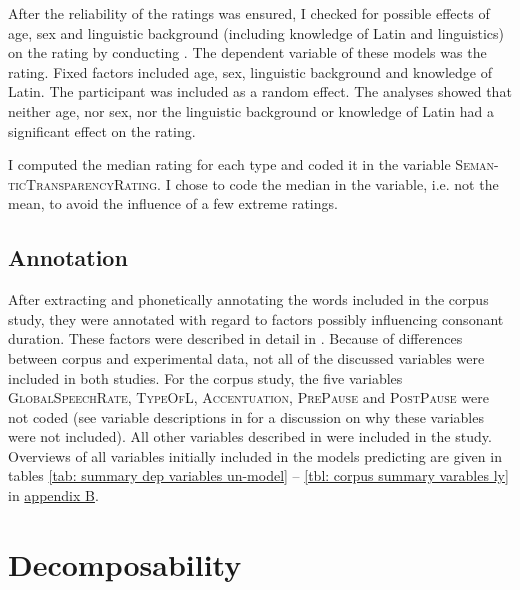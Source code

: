 After the reliability of the ratings was ensured, I checked for possible effects of age, sex and linguistic background (including knowledge of Latin and linguistics) on the rating by conducting . The dependent variable of these models was the rating. Fixed factors included age, sex, linguistic background and knowledge of Latin. The participant was included as a random effect. The analyses showed that neither age, nor sex,  nor the linguistic background or knowledge of Latin had a significant effect on the rating.

I computed the median rating for each type and coded it in the variable \textsc{Seman-ticTransparencyRating}. I chose to code the median in the variable, i.e. not the mean, to avoid the influence of a few extreme ratings. 






\subsection{Annotation} \label{Overview of the Variables in the Data Set corpus}

After extracting and phonetically annotating the words included in the corpus study, they were annotated with regard to factors possibly influencing consonant duration. These factors were described in detail in . Because of differences between corpus and experimental data, not all of the discussed variables were included in both studies. For the corpus study, the five variables \textsc{GlobalSpeechRate}, \textsc{TypeOfL}, \textsc{Accentuation}, \textsc{PrePause} and \textsc{PostPause} were not coded (see variable descriptions in  for a discussion on why these variables were not included). 
All other variables described in  were included in the study. 
Overviews of all variables initially included in the models predicting  are given in tables \ref{tab: summary dep variables un-model} -- \ref{tbl: corpus summary varables ly} in \hyperref[App B: Summaries of variables in initial models of corpus study]{appendix B}. 




\section{Decomposability} \label{corpus dec}

